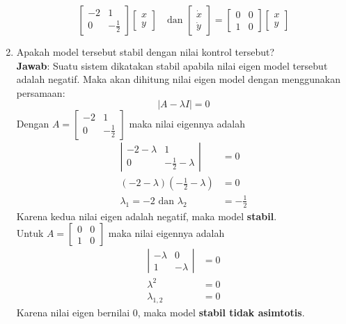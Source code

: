 \documentclass{article}
\begin{document}
\begin{enumerate}[label=\alph*.]
\[    \begin{bmatrix}
    -2 & 1 \\ 0 & -\frac{1}{2}
    \end{bmatrix} 
    \begin{bmatrix}
        x \\ y
    \end{bmatrix} \quad \text{dan }
    \begin{bmatrix}
        \dot{x} \\ \dot{y}
    \end{bmatrix} =
    \begin{bmatrix}
    0 & 0 \\
    1 & 0
    \end{bmatrix} 
    \begin{bmatrix}
        x \\ y
    \end{bmatrix}
    \]

    
    \item Apakah model tersebut stabil dengan nilai kontrol tersebut? \\
    \textbf{Jawab}: Suatu sistem dikatakan stabil apabila nilai eigen model tersebut adalah negatif. Maka akan dihitung nilai eigen model dengan menggunakan persamaan:
    \[
    |A- \lambda I| = 0
    \]
    Dengan $A = \begin{bmatrix}
    -2 & 1 \\ 0 & -\frac{1}{2}
    \end{bmatrix}$ maka nilai eigennya adalah
    \begin{align*}
        \left| \begin{array}{cc}
    -2-\lambda & 1 \\
     0& -\frac{1}{2}-\lambda
    \end{array} \right| &= 0 \\
    (-2-\lambda)\left(-\frac{1}{2}-\lambda\right)&=0 \\
    \lambda_1=-2 \text{ dan } \lambda_2&=-\frac{1}{2}
    \end{align*}
    Karena kedua nilai eigen adalah negatif, maka model \textbf{stabil}. \\
    
    Untuk $A=\begin{bmatrix}
    0 & 0 \\
    1 & 0
    \end{bmatrix}$ maka nilai eigennya adalah
    \begin{align*}
        \left| \begin{array}{cc}
    -\lambda & 0 \\
     1& -\lambda
    \end{array} \right| &= 0 \\
    \lambda^2 &=0 \\
    \lambda_{1,2} &= 0
    \end{align*}
    Karena nilai eigen bernilai $0$, maka model \textbf{stabil tidak asimtotis}.


\end{enumerate}
\end{document}
